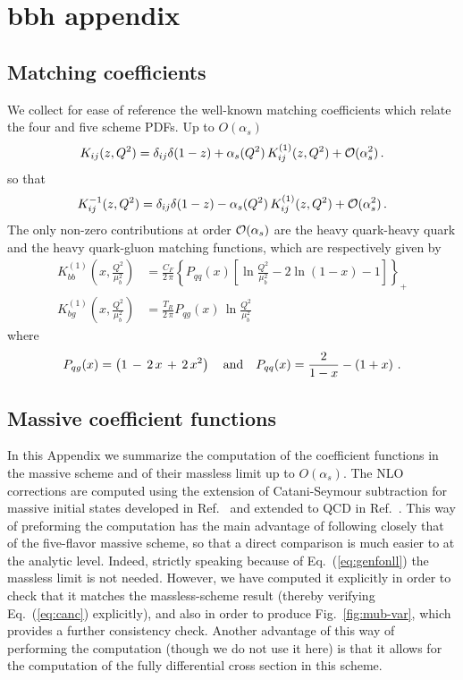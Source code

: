 \chapter{bbh appendix}

\section{Matching coefficients}
\label{sec:app-splitting}
We collect for ease of reference the well-known matching coefficients
which relate
the four and five scheme PDFs. Up to $O(\alpha_s)$
\begin{equation}
  K_{ij}(z,Q^2) = \delta_{ij}\delta(1-z) +
  \alpha_s(Q^2)\,K_{ij}^{(1)}(z,Q^2) +{\cal O}(\alpha_s^2)\,.
\end{equation}
so that
\begin{equation}
  K_{ij}^{-1}(z,Q^2) = \delta_{ij}\delta(1-z) -
  \alpha_s(Q^2)\,K_{ij}^{(1)}(z,Q^2) +{\cal O}(\alpha_s^2)\,.
\end{equation}
The only non-zero contributions at order ${\cal O}(\alpha_s)$
are the heavy quark-heavy quark and the heavy quark-gluon
matching functions, which are respectively given by
\begin{equation}
  \label{eq:ks}
  \begin{split}
    K_{bb}^{(1)}\left(x,\frac{Q^2}{\mu_b^2}\right) & = \frac{C_F}{2\,\pi}{\left\{P_{qq}(x)\left[
          \ln{\frac{Q^2}{\mu_b^2}} -2\ln(1-x)-1 \right] \right\}}_{+} \\
    K_{bg}^{(1)}\left(x,\frac{Q^2}{\mu_b^2}\right) & = \frac{T_R}{2\,\pi}
    P_{qg}(x)\,\ln{\frac{Q^2}{\mu_b^2}}
  \end{split}
\end{equation}
where 
\begin{equation}
  P_{qg}(x) = \left(1\,-\,2\,x\,+\,2\,x^2\right)\quad {\rm and }\quad
  P_{qq}(x) = \frac{2}{1-x} -\left( 1+x \right)\,.
\end{equation}

\section{Massive coefficient functions}
\label{sec:app-coeff}
In this Appendix we summarize  the computation of the
coefficient functions in the massive scheme and of their massless
limit up to $O(\alpha_s)$. The NLO corrections are computed using
the extension of
Catani-Seymour subtraction for massive initial states developed
in Ref.~\cite{Dittmaier:1999mb} and extended to QCD
in Ref.~\cite{Krauss:2017wmx}. This way of preforming the computation 
has the main advantage of following closely that of the
five-flavor massive scheme, so that a direct comparison is much easier to
at the analytic level. Indeed, strictly speaking because of
Eq.~(\ref{eq:genfonll}) the massless limit is not needed. However, we
have computed it explicitly in order to check that it matches the
massless-scheme result (thereby verifying Eq.~(\ref{eq:canc})
explicitly), and also in order to produce Fig.~\ref{fig:mub-var},
which provides a further consistency check. Another advantage of this
way of performing the computation (though we do not use it here) is
that it allows for the computation of
the fully differential cross section in this scheme. 

